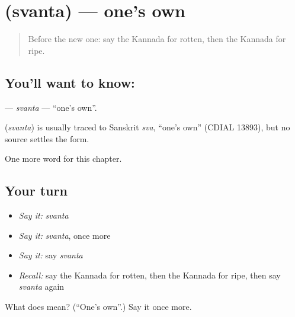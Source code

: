 \section[\texorpdfstring{\kn{ಸ್ವಂತ} (svanta)}{ಸ್ವಂತ (svanta)}]{ (svanta) — one's own}

\label{lesson:KA-C182-svanta}



\begin{quote}
Before the new one: say the Kannada for rotten, then the Kannada for ripe.
\end{quote}

\subsection*{You'll want to know: }
\textbf{} — \emph{svanta} — \textquotedblleft{}one's own\textquotedblright{}.

\begin{cousinweb}
\textbf{} (\emph{svanta}) is usually traced to Sanskrit \emph{sva}, \textquotedblleft{}one's own\textquotedblright{} (CDIAL 13893), but no source settles the form.
\end{cousinweb}

\begin{grammarlens}[title={What you've built}]
One more word for this chapter.
\end{grammarlens}

\subsection*{Your turn}
\begin{itemize}
\raggedright
  \item \emph{Say it:} \emph{svanta}
  \item \emph{Say it:} \emph{svanta}, once more
  \item \emph{Say it:} say \emph{svanta}
  \item \emph{Recall:} say the Kannada for rotten, then the Kannada for ripe, then say \emph{svanta} again
\end{itemize}

\begin{tcolorbox}[breakable,colback=teal!4,colframe=teal!35!black,title={Before you move on}]
What does  mean? (\textquotedblleft{}One's own\textquotedblright{}.) Say it once more.
\end{tcolorbox}
